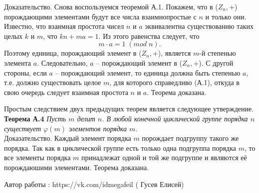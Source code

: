 \documentclass[10pt, a4paper]{scrartcl}
\numberwithin{equation}{section}
\begin{document}
	 Доказательство. Снова воспользуемся теоремой А.1. Покажем, что в ($Z_{n}, +$) порождающими элементами будут все числа взаимнопростые с $n$ и только они. Известно, что взаимная простота чисел $n$ и $a$ эквивалентна существованию таких целых $k$ и $m$, что $kn + ma = 1$. Из этого равенства следует, что 
	 \begin{equation}
	  m \cdot a = 1 \; (mod \; n).
	 \end{equation}
	 Поэтому единица, порождающий элемент в ($Z_{n}, +$), является $m$-й степенью элемента $a$. Следовательно, $a$ -- порождающий элемент в ($Z_{n}, +$). С другой стороны, если $a$ -- порождающий элемент, то единица должна быть степенью $a$, т.е. должно существовать целое $m$, для которого справедливо (А.1), откуда в свою очередь следует взаимная простота $n$ и $a$. Теорема доказана. 
	 
	 Простым следствием двух предыдущих теорем является следующее утверждение. 
	 \\
	 
	 \textbf{Теорема А.4} \textit{Пусть $m$ делит $n$. В любой конечной циклической группе порядка $n$ существует $\varphi(m)$ элементов порядка $m$.}
	 \\
	 
	 Доказательство. Каждый элемент порядка $m$ порождает подгруппу такого же порядка. Так как в циклической группе есть только одна подгруппа порядка $m$, то все элементы порядка $m$ принадлежат одной и той же подгруппе и являются её порождаюшими элементами. Теорема доказана. 
	 
	 Автор работы : https://vk.com/idmegafeil ( Гусев Елисей) 
\end{document}
